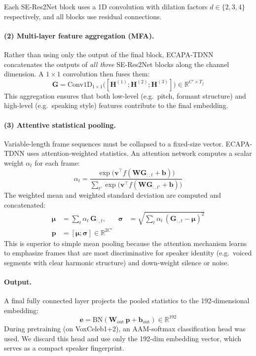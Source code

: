 \documentclass{article}
\begin{document}
Each SE-Res2Net block uses a 1D convolution with dilation factors $d \in \{2, 3, 4\}$ respectively, and all blocks use residual connections.

\paragraph{(2) Multi-layer feature aggregation (MFA).}
Rather than using only the output of the final block, ECAPA-TDNN concatenates the outputs of \emph{all three} SE-Res2Net blocks along the channel dimension. A $1 \times 1$ convolution then fuses them:
\[
    \mathbf{G} = \text{Conv1D}_{1\times1}\!\bigl([\mathbf{H}^{(1)} ; \mathbf{H}^{(2)} ; \mathbf{H}^{(3)}]\bigr) \in \mathbb{R}^{C' \times T_f}
\]
This aggregation ensures that both low-level (e.g.\ pitch, formant structure) and high-level (e.g.\ speaking style) features contribute to the final embedding.

\paragraph{(3) Attentive statistical pooling.}
Variable-length frame sequences must be collapsed to a fixed-size vector. ECAPA-TDNN uses attention-weighted statistics. An attention network computes a scalar weight $\alpha_t$ for each frame:
\[
    \alpha_t = \frac{\exp\!\bigl(\mathbf{v}^{\top} f(\mathbf{W} \mathbf{G}_{:,t} + \mathbf{b})\bigr)}
               {\sum_{t'} \exp\!\bigl(\mathbf{v}^{\top} f(\mathbf{W} \mathbf{G}_{:,t'} + \mathbf{b})\bigr)}
\]
The weighted mean and weighted standard deviation are computed and concatenated:
\begin{align}
    \boldsymbol{\mu} &= \sum_t \alpha_t\, \mathbf{G}_{:,t}, &
    \boldsymbol{\sigma} &= \sqrt{\sum_t \alpha_t\, (\mathbf{G}_{:,t} - \boldsymbol{\mu})^2} \\
    \mathbf{p} &= [\boldsymbol{\mu} ; \boldsymbol{\sigma}] \in \mathbb{R}^{2C'}
\end{align}
This is superior to simple mean pooling because the attention mechanism learns to emphasize frames that are most discriminative for speaker identity (e.g.\ voiced segments with clear harmonic structure) and down-weight silence or noise.

\paragraph{Output.}
A final fully connected layer projects the pooled statistics to the 192-dimensional embedding:
\[
    \mathbf{e} = \text{BN}(\mathbf{W}_{\text{out}}\, \mathbf{p} + \mathbf{b}_{\text{out}}) \in \mathbb{R}^{192}
\]
During pretraining (on VoxCeleb1+2), an AAM-softmax classification head was used. We discard this head and use only the 192-dim embedding vector, which serves as a compact speaker fingerprint.
\end{document}
